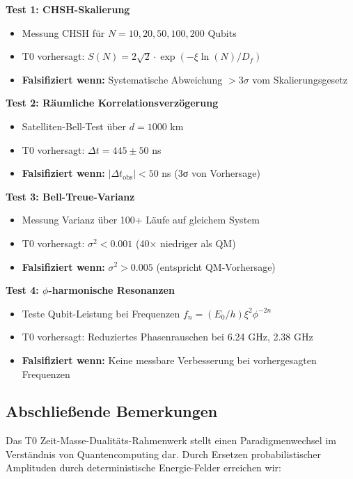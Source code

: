 \begin{experimentbox}
	\textbf{Test 1: CHSH-Skalierung}
	\begin{itemize}
		\item Messung CHSH für $N = 10, 20, 50, 100, 200$ Qubits
		\item T0 vorhersagt: $S(N) = 2\sqrt{2} \cdot \exp(-\xi \ln(N)/D_f)$
		\item \textbf{Falsifiziert wenn:} Systematische Abweichung $> 3\sigma$ vom Skalierungsgesetz
	\end{itemize}
	
	\textbf{Test 2: Räumliche Korrelationsverzögerung}
	\begin{itemize}
		\item Satelliten-Bell-Test über $d = 1000$ km
		\item T0 vorhersagt: $\Delta t = 445 \pm 50$ ns
		\item \textbf{Falsifiziert wenn:} $|\Delta t_{\text{obs}}| < 50$ ns (3σ von Vorhersage)
	\end{itemize}
	
	\textbf{Test 3: Bell-Treue-Varianz}
	\begin{itemize}
		\item Messung Varianz über 100+ Läufe auf gleichem System
		\item T0 vorhersagt: $\sigma^2 < 0.001$ (40× niedriger als QM)
		\item \textbf{Falsifiziert wenn:} $\sigma^2 > 0.005$ (entspricht QM-Vorhersage)
	\end{itemize}
	
	\textbf{Test 4: $\phi$-harmonische Resonanzen}
	\begin{itemize}
		\item Teste Qubit-Leistung bei Frequenzen $f_n = (E_0/h) \xi^2 \phi^{-2n}$
		\item T0 vorhersagt: Reduziertes Phasenrauschen bei 6.24 GHz, 2.38 GHz
		\item \textbf{Falsifiziert wenn:} Keine messbare Verbesserung bei vorhergesagten Frequenzen
	\end{itemize}
\end{experimentbox}

\subsection{Abschließende Bemerkungen}

Das T0 Zeit-Masse-Dualitäts-Rahmenwerk stellt einen Paradigmenwechsel im Verständnis von Quantencomputing dar. Durch Ersetzen probabilistischer Amplituden durch deterministische Energie-Felder erreichen wir:

